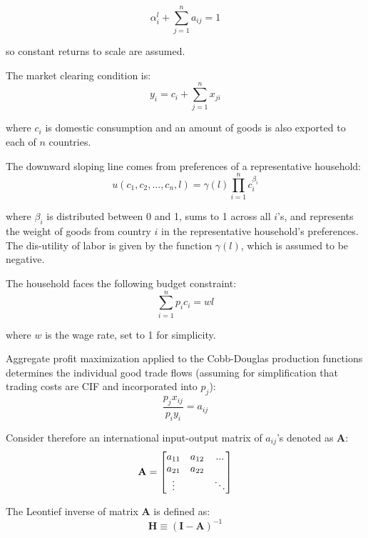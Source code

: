 \documentclass[10pt,letterpaper,pdftex]{article}
\begin{document}
\begin{equation*}
 \alpha_i^l + \sum_{j=1}^{n} a_{ij} = 1
\end{equation*}

so constant returns to scale are assumed. 

The market clearing condition is:
\begin{equation*}
y_i = c_i + \sum_{j=1}^{n} x_{ji}
\end{equation*}

where $c_i$ is domestic consumption and an amount of goods is also exported to each of $n$ countries.

The downward sloping line comes from preferences of a representative household:
\begin{equation*}
u(c_1,c_2,...,c_n,l) = \gamma (l) \prod_{i=1}^{n} c_i^{\beta_i}
\end{equation*}

where $\beta_i$ is distributed between 0 and 1, sums to 1 across all $i$'s, and represents the weight of goods from country $i$ in the representative household's preferences. The dis-utility of labor is given by the function $\gamma (l)$, which is assumed to be negative.

The household faces the following budget constraint:
\begin{equation*}
 \sum_{i=1}^{n} p_ic_i = wl
\end{equation*}

where $w$ is the wage rate, set to 1 for simplicity.

Aggregate profit maximization applied to the Cobb-Douglas production functions determines the individual good trade flows (assuming for simplification that trading costs are CIF and incorporated into $p_j$):
$$ \frac{p_jx_{ij}}{p_iy_i} = a_{ij}$$

Consider therefore an international input-output matrix of $a_{ij}$'s denoted as \textbf{A}:
\begin{equation*}
\text{\textbf{A}} = \begin{bmatrix}
		a_{11} & a_{12} & ... \\
		a_{21} & a_{22} &  \\
		\vdots &  & \ddots 
		\end{bmatrix}
\end{equation*}		

The Leontief inverse of matrix \textbf{A} is defined as:
\begin{equation*}
 \mathbf{H} \equiv (\mathbf{I} - \mathbf{A})^{-1} 
\end{equation*}
\end{document}
